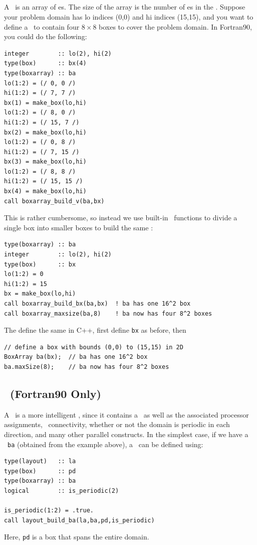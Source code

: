 \subsection{\BoxArray}

A \BoxArray\ is an array of \BoxType es.  The size of the array is the 
number of \BoxType es in the \BoxArray.  Suppose your problem domain
has lo indices (0,0) and hi indices (15,15), and you want to define
a \BoxArray\ to contain four $8\times 8$ boxes to cover the problem domain.
In Fortran90, you could do the following:
\begin{lstlisting}[backgroundcolor=\color{light-green}]
integer        :: lo(2), hi(2)
type(box)      :: bx(4)
type(boxarray) :: ba
lo(1:2) = (/ 0, 0 /)
hi(1:2) = (/ 7, 7 /)
bx(1) = make_box(lo,hi)
lo(1:2) = (/ 8, 0 /)
hi(1:2) = (/ 15, 7 /)
bx(2) = make_box(lo,hi)
lo(1:2) = (/ 0, 8 /)
hi(1:2) = (/ 7, 15 /)
bx(3) = make_box(lo,hi)
lo(1:2) = (/ 8, 8 /)
hi(1:2) = (/ 15, 15 /)
bx(4) = make_box(lo,hi)
call boxarray_build_v(ba,bx)
\end{lstlisting}
This is rather cumbersome, so instead we use built-in \BoxLib\ functions to
divide a single box into smaller boxes to build the same \BoxArray:
\begin{lstlisting}[backgroundcolor=\color{light-green}]
type(boxarray) :: ba
integer        :: lo(2), hi(2)
type(box)      :: bx
lo(1:2) = 0
hi(1:2) = 15
bx = make_box(lo,hi)
call boxarray_build_bx(ba,bx)  ! ba has one 16^2 box
call boxarray_maxsize(ba,8)    ! ba now has four 8^2 boxes
\end{lstlisting}
The define the same \BoxArray in C++, first define {\tt bx} as before, then
\begin{lstlisting}[backgroundcolor=\color{light-blue}]
// define a box with bounds (0,0) to (15,15) in 2D
BoxArray ba(bx);  // ba has one 16^2 box
ba.maxSize(8);    // ba now has four 8^2 boxes
\end{lstlisting}

\subsection{\layout\ (Fortran90 Only)}

A \layout\ is a more intelligent \BoxArray,
since it contains a \BoxArray\ as well
as the associated processor assignments, \BoxType\ connectivity, whether or not the 
domain is periodic in each direction, and many other
parallel constructs.  In the simplest case, if we have a \BoxArray\ {\tt ba} (obtained
from the example above), a \layout\ can be defined using:
\begin{lstlisting}[backgroundcolor=\color{light-green}]
type(layout)   :: la
type(box)      :: pd
type(boxarray) :: ba
logical        :: is_periodic(2)

is_periodic(1:2) = .true.
call layout_build_ba(la,ba,pd,is_periodic)
\end{lstlisting}
Here, {\tt pd} is a box that spans the entire domain.

